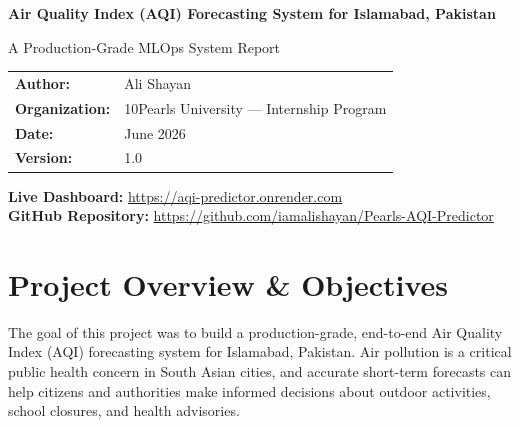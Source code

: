 \documentclass[11pt,a4paper]{article}
\begin{document}
\begin{titlepage}
    \centering
    \vspace*{2cm}
    
    \Huge
    \textbf{\textcolor{primary}{Air Quality Index (AQI) Forecasting System for Islamabad, Pakistan}}
    
    \vspace{0.5cm}
    \LARGE
    \textcolor{secondary}{A Production-Grade MLOps System Report}
    
    \vspace{2cm}
    
    \makebox[\textwidth]{\color{secondary}\rule{\textwidth}{2pt}}
    
    \vspace{2cm}
    
    \large
    \begin{tabular}{ll}
        \textbf{Author:} & Ali Shayan \\
        \textbf{Organization:} & 10Pearls University --- Internship Program \\
        \textbf{Date:} & June 2026 \\
        \textbf{Version:} & 1.0
    \end{tabular}
    
    \vfill
    
    \makebox[\textwidth]{\color{accent}\rule{\textwidth}{1pt}}
    
    \vspace{0.8cm}
    \small
    \textbf{Live Dashboard:} \url{https://aqi-predictor.onrender.com} \\
    \textbf{GitHub Repository:} \url{https://github.com/iamalishayan/Pearls-AQI-Predictor}
    
    \vspace*{1cm}
\end{titlepage}

\newpage
\tableofcontents
\newpage

\section{Project Overview \& Objectives}

The goal of this project was to build a production-grade, end-to-end Air Quality Index (AQI) forecasting system for Islamabad, Pakistan. Air pollution is a critical public health concern in South Asian cities, and accurate short-term forecasts can help citizens and authorities make informed decisions about outdoor activities, school closures, and health advisories.
\end{document}
